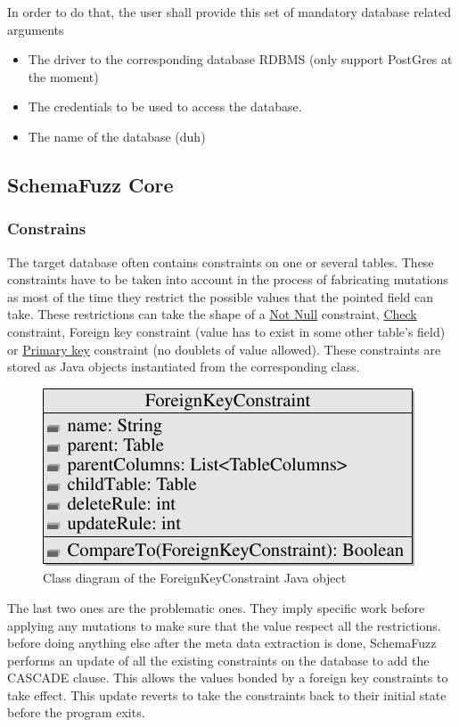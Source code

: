 \documentclass{article}
\begin{document}
\begin{empfile}
In order to do that, the user shall provide this set of mandatory database related arguments
			\begin{itemize}
 				\item The driver to the corresponding database RDBMS (only support PostGres at the moment)
 				\item The credentials to be used to access the database.
 				\item The name of the database (duh)
			\end{itemize}
		\subsection{SchemaFuzz Core}		
			\subsubsection{Constrains}
The target database often contains constraints on one or several tables. These constraints have to be taken into account in the process of fabricating mutations as most of the time they restrict the possible values that the pointed field can take. These restrictions can take the shape of a \underline {Not Null} constraint, \underline{Check} constraint, {Foreign key} constraint (value has to exist in some other table's field) or \underline{Primary key} constraint (no doublets of value allowed). These constraints are stored as Java objects instantiated from the corresponding class.
\bigskip

\begin{figure} [h!]
\centering
\includegraphics[width=\textwidth]{ForeignKeyClassDiagram-1.pdf}
\caption{Class diagram of the ForeignKeyConstraint Java object}
\end{figure}

\bigskip

The last two ones are the problematic ones. They imply specific work before applying any mutations to make sure that the value respect all the restrictions. before doing anything else after the meta data extraction is done, SchemaFuzz performs an update of all the existing constraints on the database to add the CASCADE clause. This allows the values bonded by a foreign key constraints to take effect. This update reverts to take the constraints back to their initial state before the program exits.

\end{empfile}
\end{document}
